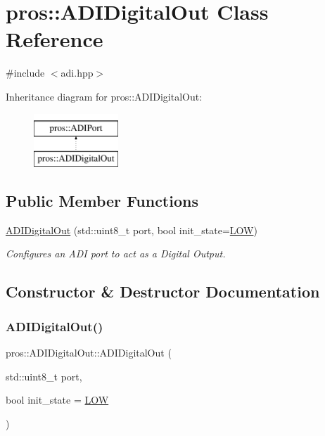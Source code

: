 \hypertarget{classpros_1_1ADIDigitalOut}{}\section{pros\+:\+:A\+D\+I\+Digital\+Out Class Reference}
\label{classpros_1_1ADIDigitalOut}


{\ttfamily \#include $<$adi.\+hpp$>$}

Inheritance diagram for pros\+:\+:A\+D\+I\+Digital\+Out\+:\begin{figure}[H]
\begin{center}
\leavevmode
\includegraphics[height=2.000000cm]{classpros_1_1ADIDigitalOut}
\end{center}
\end{figure}
\subsection*{Public Member Functions}
\begin{DoxyCompactItemize}
\item 
\hyperlink{classpros_1_1ADIDigitalOut_a1c5dbea7f767418550df8007cfb0d221}{A\+D\+I\+Digital\+Out} (std\+::uint8\+\_\+t port, bool init\+\_\+state=\hyperlink{adi_8h_ab811d8c6ff3a505312d3276590444289}{L\+OW})
\begin{DoxyCompactList}\small\item\em Configures an A\+DI port to act as a Digital Output. \end{DoxyCompactList}\end{DoxyCompactItemize}


\subsection{Constructor \& Destructor Documentation}
\mbox{\label{classpros_1_1ADIDigitalOut_a1c5dbea7f767418550df8007cfb0d221}} 
\subsubsection{\texorpdfstring{A\+D\+I\+Digital\+Out()}{ADIDigitalOut()}}
{\footnotesize\ttfamily pros\+::\+A\+D\+I\+Digital\+Out\+::\+A\+D\+I\+Digital\+Out (\begin{DoxyParamCaption}\item[{std\+::uint8\+\_\+t}]{port,  }\item[{bool}]{init\+\_\+state = {\ttfamily \hyperlink{adi_8h_ab811d8c6ff3a505312d3276590444289}{L\+OW}} }\end{DoxyParamCaption})}



